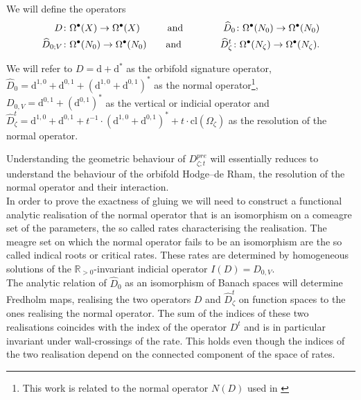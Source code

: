 \documentclass[psamsfonts]{amsart}
\theoremstyle{plain}
\theoremstyle{definition}{
\newtheorem{defi}{Definition}[section]
\newtheorem{ass}{Assumption}
\newtheorem*{nota}{Notation}}
\theoremstyle{remark}{
\newtheorem{rem}{Remark}
\newtheorem{ex}{Example}}
\theoremstyle{plain}{
\newtheorem{thm}{Theorem}[section]
\newtheorem{lem}{Lemma}[section]
\newtheorem{cor}{Corollary}[section]
\newtheorem{prop}{Proposition}[section]
\newtheorem{con}{Conjecture}[section]}
\newcommand{\m}[1]{{\mathrm{#1}}}
\newcommand{\und}[1]{\hspace{#1}\text{and}\hspace{#1}}
\begin{document}
\begin{defi}
We will define the operators
\begin{align*}
    D& \colon\Omega^{\bullet}(X)\rightarrow \Omega^{\bullet}(X)\und{1.0cm}
    &\widehat{D}_0 \colon\Omega^{\bullet}(N_0)\rightarrow \Omega^{\bullet}(N_0)\\
        \widehat{D}_{0;V}& \colon\Omega^{\bullet}(N_0)\rightarrow \Omega^{\bullet}(N_0)\und{0.7cm}
        &\widehat{D}^t_\zeta \colon\Omega^{\bullet}(N_\zeta)\rightarrow \Omega^{\bullet}(N_\zeta).
\end{align*}

    
We will refer to $D=\m{d}+\m{d}^*$ as the orbifold signature operator, $\widehat{D}_0=\m{d}^{1,0}+\m{d}^{0,1}+\left(\m{d}^{1,0}+\m{d}^{0,1}\right)^*$ as the normal operator\footnote{This work is related to the normal operator $N(D)$ used in \cite{mazzeo1991elliptic}}, $D_{0,V}=\m{d}^{0,1}+\left(\m{d}^{0,1}\right)^*$ as the vertical or indicial operator and $\widehat{D}^t_\zeta=\m{d}^{1,0}+\m{d}^{0,1}+t^{-1}\cdot \left(\m{d}^{1,0}+\m{d}^{0,1}\right)^*+t\cdot\m{cl}(\Omega_\zeta)$ as the resolution of the normal operator.
\end{defi}



Understanding the geometric behaviour of $D_{\zeta;t}^{pre}$ will essentially reduces to understand the behaviour of the orbifold Hodge--de Rham, the resolution of the normal operator and their interaction.\\

In order to prove the exactness of gluing we will need to construct a functional analytic realisation of the normal operator that is an isomorphism on a comeagre set of the parameters, the so called rates characterising the realisation. The meagre set on which the normal operator fails to be an isomorphism are the so called indical roots or critical rates. These rates are determined by homogeneous solutions of the $\mathbb{R}_{>0}$-invariant indicial operator $I(D)=D_{0,V}$.\\

The analytic relation of $\widehat{D}_0$ as an isomorphism of Banach spaces will determine Fredholm maps, realising the two operators $D$ and $\widehat{D}^t_\zeta$ on function spaces  to the ones realising the normal operator. The sum of the indices of these two realisations coincides with the index of the operator $D^{t}$ and is in particular invariant under wall-crossings of the rate. This holds even though the indices of the two realisation depend on the connected component of the space of rates.\\
\end{document}
